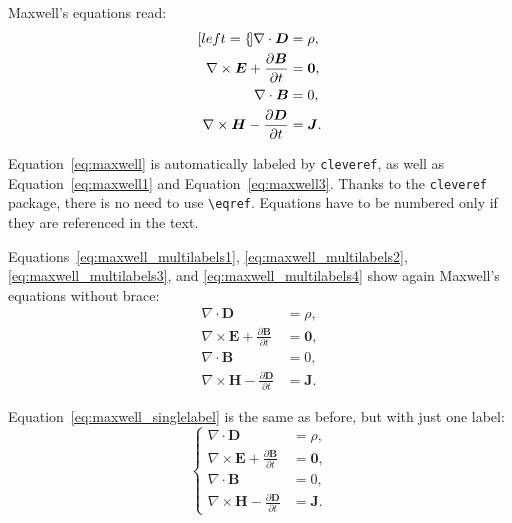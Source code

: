 \documentclass[11pt,a4paper]{article}
\begin{document}
Maxwell's equations read:
\begin{subequations}
	\label{eq:maxwell}
	\begin{align}[left=\empheqlbrace]
		\nabla\cdot \bm{D}                                         & = \rho, \label{eq:maxwell1}   \\
		\nabla \times \bm{E} +  \frac{\partial \bm{B}}{\partial t} & = \bm{0}, \label{eq:maxwell2} \\
		\nabla\cdot \bm{B}                                         & = 0, \label{eq:maxwell3}      \\
		\nabla \times \bm{H} - \frac{\partial \bm{D}}{\partial t}  & = \bm{J}. \label{eq:maxwell4}
	\end{align}
\end{subequations}

Equation~\eqref{eq:maxwell} is automatically labeled by \texttt{cleveref},
as well as Equation~\eqref{eq:maxwell1} and Equation~\eqref{eq:maxwell3}.
Thanks to the \verb|cleveref| package, there is no need to use \verb|\eqref|.
Equations have to be numbered only if they are referenced in the text.

Equations~\eqref{eq:maxwell_multilabels1}, \eqref{eq:maxwell_multilabels2}, \eqref{eq:maxwell_multilabels3}, and \eqref{eq:maxwell_multilabels4} show again Maxwell's equations without brace:
\begin{align}
	\nabla\cdot \bm{D}                                         & = \rho, \label{eq:maxwell_multilabels1}   \\
	\nabla \times \bm{E} +  \frac{\partial \bm{B}}{\partial t} & = \bm{0}, \label{eq:maxwell_multilabels2} \\
	\nabla\cdot \bm{B}                                         & = 0, \label{eq:maxwell_multilabels3}      \\
	\nabla \times \bm{H} - \frac{\partial \bm{D}}{\partial t}  & = \bm{J} \label{eq:maxwell_multilabels4}.
\end{align}

Equation~\eqref{eq:maxwell_singlelabel} is the same as before,
but with just one label:
\begin{equation}
	\label{eq:maxwell_singlelabel}
	\left\{
	\begin{aligned}
		\nabla\cdot \bm{D}                                         & = \rho,   \\
		\nabla \times \bm{E} +  \frac{\partial \bm{B}}{\partial t} & = \bm{0}, \\
		\nabla\cdot \bm{B}                                         & = 0,      \\
		\nabla \times \bm{H} - \frac{\partial \bm{D}}{\partial t}  & = \bm{J}.
	\end{aligned}
	\right.
\end{equation}
\end{document}
